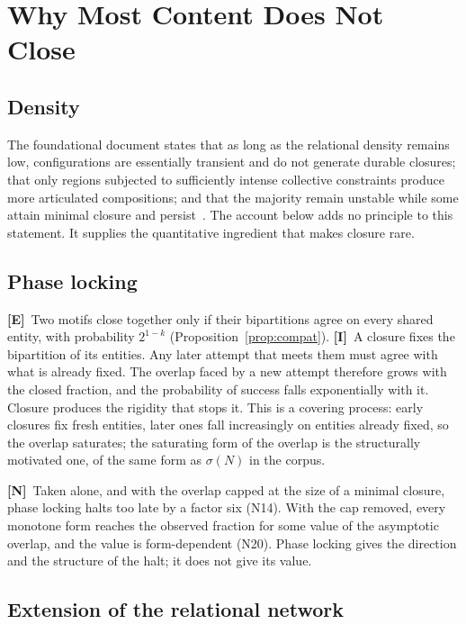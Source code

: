 \documentclass[11pt,a4paper]{article}
\theoremstyle{plain}
\theoremstyle{definition}
\theoremstyle{remark}
\newcommand{\statE}{\textbf{[E]}}
\newcommand{\statN}{\textbf{[N]}}
\newcommand{\statI}{\textbf{[I]}}
\begin{document}
\section{Why Most Content Does Not Close}
\label{sec:mechanism}

\subsection{Density}

The foundational document states that as long as the relational density remains low, configurations are essentially transient and do not generate durable closures; that only regions subjected to sufficiently intense collective constraints produce more articulated compositions; and that the majority remain unstable while some attain minimal closure and persist~\citep{D01}. The account below adds no principle to this statement. It supplies the quantitative ingredient that makes closure rare.

\subsection{Phase locking}

\statE\ Two motifs close together only if their bipartitions agree on every shared entity, with probability $2^{1-k}$ (Proposition~\ref{prop:compat}). \statI\ A closure fixes the bipartition of its entities. Any later attempt that meets them must agree with what is already fixed. The overlap faced by a new attempt therefore grows with the closed fraction, and the probability of success falls exponentially with it. Closure produces the rigidity that stops it. This is a covering process: early closures fix fresh entities, later ones fall increasingly on entities already fixed, so the overlap saturates; the saturating form of the overlap is the structurally motivated one, of the same form as $\sigma(N)$ in the corpus.

\statN\ Taken alone, and with the overlap capped at the size of a minimal closure, phase locking halts too late by a factor six (N14). With the cap removed, every monotone form reaches the observed fraction for some value of the asymptotic overlap, and the value is form-dependent (N20). Phase locking gives the direction and the structure of the halt; it does not give its value.

\subsection{Extension of the relational network}
\end{document}
